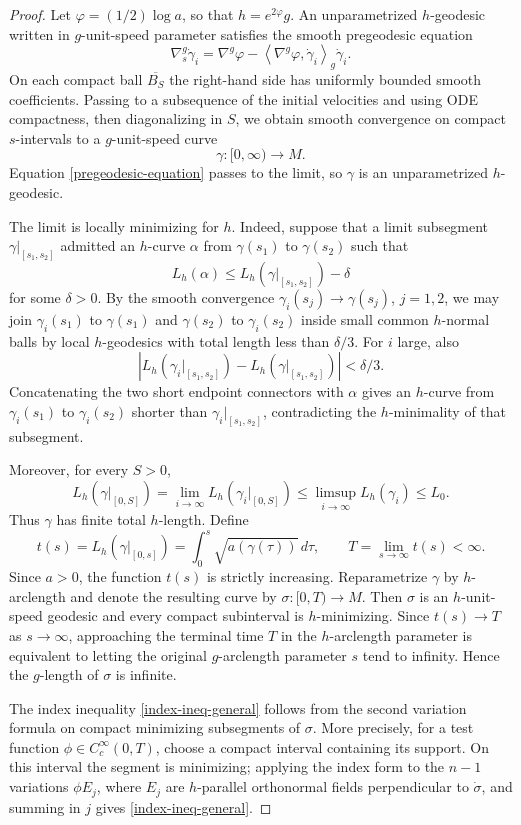 \documentclass[11pt]{amsart}
\numberwithin{equation}{section}
\newcommand{\ip}[2]{\left\langle #1,#2\right\rangle}
\begin{document}
\begin{proof}
Let $\varphi=(1/2)\log a$, so that $h=e^{2\varphi}g$.  An unparametrized $h$-geodesic written in $g$-unit-speed parameter satisfies the smooth pregeodesic equation
\begin{equation}\label{pregeodesic-equation}
        \nabla^g_s\dot\gamma_i
        =\nabla^g\varphi-\ip{\nabla^g\varphi}{\dot\gamma_i}_g\dot\gamma_i .
\end{equation}
On each compact ball $\overline{B_S}$ the right-hand side has uniformly bounded smooth coefficients.  Passing to a subsequence of the initial velocities and using ODE compactness, then diagonalizing in $S$, we obtain smooth convergence on compact $s$-intervals to a $g$-unit-speed curve
$$
        \gamma:[0,\infty)\to M.
$$
Equation \eqref{pregeodesic-equation} passes to the limit, so $\gamma$ is an unparametrized $h$-geodesic.

The limit is locally minimizing for $h$.  Indeed, suppose that a limit subsegment $\gamma|_{[s_1,s_2]}$ admitted an $h$-curve $\alpha$ from $\gamma(s_1)$ to $\gamma(s_2)$ such that
$$
        L_h(\alpha)\leq L_h(\gamma|_{[s_1,s_2]})-\delta
$$
for some $\delta>0$.  By the smooth convergence $\gamma_i(s_j)\to\gamma(s_j)$, $j=1,2$, we may join $\gamma_i(s_1)$ to $\gamma(s_1)$ and $\gamma(s_2)$ to $\gamma_i(s_2)$ inside small common $h$-normal balls by local $h$-geodesics with total length less than $\delta/3$.  For $i$ large, also
$$
        \left|L_h(\gamma_i|_{[s_1,s_2]})-L_h(\gamma|_{[s_1,s_2]})\right|<\delta/3 .
$$
Concatenating the two short endpoint connectors with $\alpha$ gives an $h$-curve from $\gamma_i(s_1)$ to $\gamma_i(s_2)$ shorter than $\gamma_i|_{[s_1,s_2]}$, contradicting the $h$-minimality of that subsegment.

Moreover, for every $S>0$,
$$
        L_h(\gamma|_{[0,S]})
        =\lim_{i\to\infty}L_h(\gamma_i|_{[0,S]})
        \leq \limsup_{i\to\infty} L_h(\gamma_i)
        \leq L_0 .
$$
Thus $\gamma$ has finite total $h$-length.  Define
$$
        t(s)=L_h(\gamma|_{[0,s]})=\int_0^s \sqrt{a(\gamma(\tau))}\,d\tau,
        \qquad
        T=\lim_{s\to\infty}t(s)<\infty .
$$
Since $a>0$, the function $t(s)$ is strictly increasing.  Reparametrize $\gamma$ by $h$-arclength and denote the resulting curve by $\sigma:[0,T)\to M$.  Then $\sigma$ is an $h$-unit-speed geodesic and every compact subinterval is $h$-minimizing.  Since $t(s)\to T$ as $s\to\infty$, approaching the terminal time $T$ in the $h$-arclength parameter is equivalent to letting the original $g$-arclength parameter $s$ tend to infinity.  Hence the $g$-length of $\sigma$ is infinite.

The index inequality \eqref{index-ineq-general} follows from the second variation formula on compact minimizing subsegments of $\sigma$.  More precisely, for a test function $\phi\in C_c^\infty(0,T)$, choose a compact interval containing its support.  On this interval the segment is minimizing; applying the index form to the $n-1$ variations $\phi E_j$, where $E_j$ are $h$-parallel orthonormal fields perpendicular to $\dot\sigma$, and summing in $j$ gives \eqref{index-ineq-general}.
\end{proof}
\end{document}
